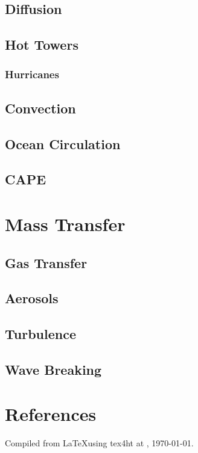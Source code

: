 \documentclass{report}
\begin{document}
    \section{Diffusion}
\label{diffusion}
    \lipsum[1-2]

    \section{Hot Towers}
\label{hottowers}
    \lipsum[1-2]

\subsection{Hurricanes}
\label{hurricanes}

    \section{Convection}
\label{convection}
    \lipsum[1-2]

    \section{Ocean Circulation}
\label{circulation}
    \lipsum[1-2]

    \section{CAPE}
\label{cape}
    \lipsum[1-2]

\chapter{Mass Transfer}
\label{masstransfer}
    \lipsum[10]
  
    \section{Gas Transfer}
\label{gastransfer}
    \lipsum[1-2]
   
    \section{Aerosols}
\label{aerosols}
    \lipsum[1-2]

    \section{Turbulence}
\label{massturbulence}
    \lipsum[1-2]
  
    \section{Wave Breaking}
\label{masswavebreaking}
    \lipsum[1-2]

\chapter{References}


Compiled from \LaTeX using tex4ht at \currenttime, \today.
  
\end{document}
